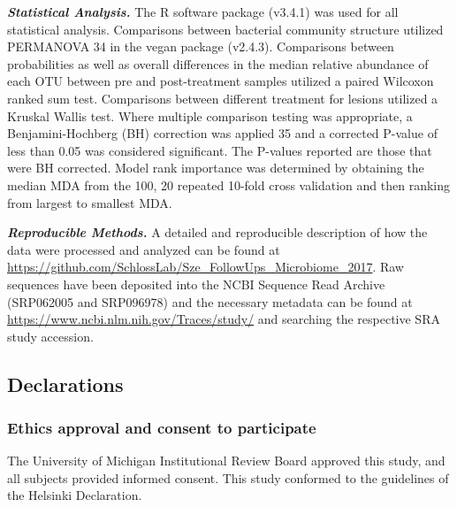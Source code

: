\documentclass[12pt,]{article}
\providecommand{\DIFaddtex}[1]{{\protect\color{blue}\uwave{#1}}} %
\providecommand{\DIFaddbegin}{} %
\providecommand{\DIFaddend}{} %
\providecommand{\DIFdelbegin}{} %
\providecommand{\DIFdelend}{} %
\providecommand{\DIFadd}[1]{\texorpdfstring{\DIFaddtex{#1}}{#1}} %
\begin{document}
\textbf{\emph{Statistical Analysis.}} The R software package (v3.4.1)
was used for all statistical analysis. Comparisons between bacterial
community structure utilized PERMANOVA \DIFdelbegin %
\DIFdelend \DIFaddbegin \DIFadd{(}\DIFaddend 34\DIFdelbegin %
\DIFdelend \DIFaddbegin \DIFadd{) }\DIFaddend in the vegan package
(v2.4.3). Comparisons between probabilities as well as overall
differences in the median relative abundance of each OTU between pre and
post-treatment samples utilized a paired Wilcoxon ranked sum test.
Comparisons between different treatment for lesions utilized a Kruskal
Wallis test. Where multiple comparison testing was appropriate, a
Benjamini-Hochberg (BH) correction was applied \DIFdelbegin %
\DIFdelend \DIFaddbegin \DIFadd{(}\DIFaddend 35\DIFdelbegin %
\DIFdelend \DIFaddbegin \DIFadd{) }\DIFaddend and a corrected
P-value of less than 0.05 was considered significant. The P-values
reported are those that were BH corrected. Model rank importance was
determined by obtaining the median MDA from the 100, 20 repeated 10-fold
cross validation and then ranking from largest to smallest MDA.

\textbf{\emph{Reproducible Methods.}} A detailed and reproducible
description of how the data were processed and analyzed can be found at
\DIFdelbegin %
\DIFdelend \DIFaddbegin \url{https://github.com/SchlossLab/Sze_FollowUps_Microbiome_2017}\DIFaddend . Raw
sequences have been deposited into the NCBI Sequence Read Archive
(SRP062005 and SRP096978) and the necessary metadata can be found at
\url{https://www.ncbi.nlm.nih.gov/Traces/study/} and searching the
respective SRA study accession.

\newpage

\subsection{Declarations}\label{declarations}

\subsubsection{Ethics approval and consent to
participate}\label{ethics-approval-and-consent-to-participate}

The University of Michigan Institutional Review Board approved this
study, and all subjects provided informed consent. This study conformed
to the guidelines of the Helsinki Declaration.
\end{document}
